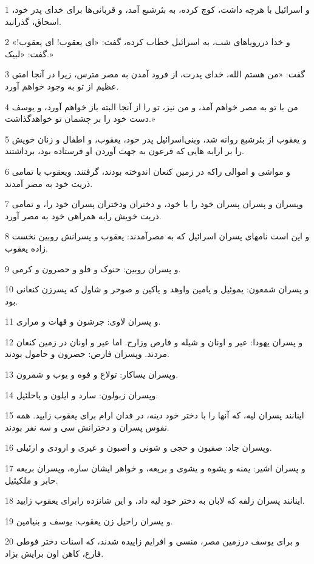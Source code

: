 \par 1 و اسرائیل با هر‌چه داشت، کوچ کرده، به بئرشبع آمد، و قربانی‌ها برای خدای پدر خود، اسحاق، گذرانید. 
\par 2 و خدا دررویاهای شب، به اسرائیل خطاب کرده، گفت: «ای یعقوب! ای یعقوب!» گفت: «لبیک.»
\par 3 گفت: «من هستم الله، خدای پدرت، از فرود آمدن به مصر مترس، زیرا در آنجا امتی عظیم از تو به وجود خواهم آورد.
\par 4 من با تو به مصر خواهم آمد، و من نیز، تو را از آنجا البته باز خواهم آورد، و یوسف دست خود را بر چشمان تو خواهدگذاشت.»
\par 5 و یعقوب از بئرشبع روانه شد، وبنی‌اسرائیل پدر خود، یعقوب، و اطفال و زنان خویش را بر ارابه هایی که فرعون به جهت آوردن او فرستاده بود، برداشتند.
\par 6 و مواشی و اموالی راکه در زمین کنعان اندوخته بودند، گرفتند. ویعقوب با تمامی ذریت خود به مصر آمدند.
\par 7 وپسران و پسران پسران خود را با خود، و دختران ودختران پسران خود را، و تمامی ذریت خویش رابه همراهی خود به مصر آورد.
\par 8 و این است نامهای پسران اسرائیل که به مصرآمدند: یعقوب و پسرانش روبین نخست زاده یعقوب.
\par 9 و پسران روبین: حنوک و فلو و حصرون و کرمی.
\par 10 و پسران شمعون: یموئیل و یامین واوهد و یاکین و صوحر و شاول که پسرزن کنعانی بود.
\par 11 و پسران لاوی: جرشون و قهات و مراری.
\par 12 و پسران یهودا: عیر و اونان و شیله و فارص وزارح. اما عیر و اونان در زمین کنعان مردند. وپسران فارص: حصرون و حامول بودند.
\par 13 وپسران یساکار: تولاع و فوه و یوب و شمرون.
\par 14 وپسران زبولون: سارد و ایلون و یاحلئیل.
\par 15 اینانند پسران لیه، که آنها را با دختر خود دینه، در فدان ارام برای یعقوب زایید. همه نفوس پسران و دخترانش سی و سه نفر بودند.
\par 16 وپسران جاد: صفیون و حجی و شونی و اصبون و عیری و ارودی و ارئیلی.
\par 17 و پسران اشیر: یمنه و یشوه و یشوی و بریعه، و خواهر ایشان ساره، وپسران بریعه حابر و ملکیئیل.
\par 18 اینانند پسران زلفه که لابان به دختر خود لیه داد، و این شانزده رابرای یعقوب زایید.
\par 19 و پسران راحیل زن یعقوب: یوسف و بنیامین.
\par 20 و برای یوسف درزمین مصر، منسی و افرایم زاییده شدند، که اسنات دختر فوطی فارع، کاهن اون برایش بزاد.
